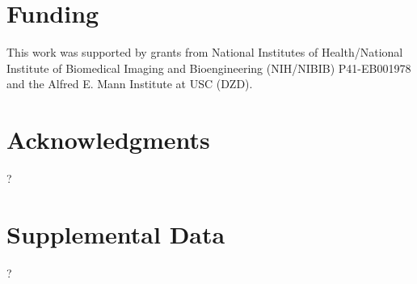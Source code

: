 \documentclass[utf8]{frontiersSCNS} %
\begin{document}
\section*{Funding}
This work was supported by grants from National Institutes of Health/National Institute of Biomedical Imaging and Bioengineering (NIH/NIBIB) P41-EB001978 and the Alfred E. Mann Institute at USC (DZD).

\section*{Acknowledgments}
?

\section*{Supplemental Data}
?





\end{document}
